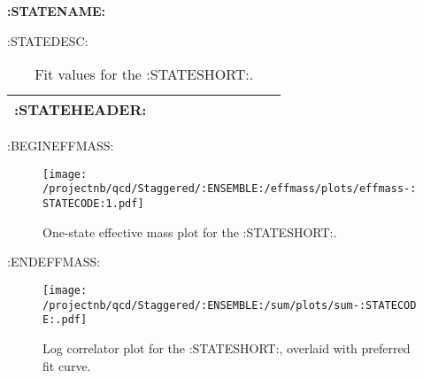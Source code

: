 
\centerline{\textbf{:STATENAME:}}

:STATEDESC:

\begin{table}[ht!]
\centering
\begin{tabular}{:STATETABLE:}
\hline
 :STATEHEADER: \\
\hline

\end{tabular}
\caption{Fit values for the :STATESHORT:.}
\end{table}

:BEGINEFFMASS:
\begin{figure}[H]
\centering
\texttt{[image: /projectnb/qcd/Staggered/:ENSEMBLE:/effmass/plots/effmass-:STATECODE:1.pdf]}
\caption{One-state effective mass plot for the :STATESHORT:.}
\end{figure}
:ENDEFFMASS:

\begin{figure}[H]
\centering
\texttt{[image: /projectnb/qcd/Staggered/:ENSEMBLE:/sum/plots/sum-:STATECODE:.pdf]}
\caption{Log correlator plot for the :STATESHORT:, overlaid with preferred fit curve.}
\end{figure}

